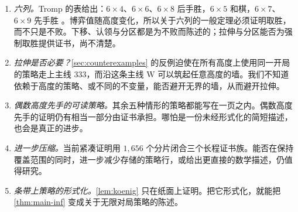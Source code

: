 \documentclass[11pt,a4paper]{article}
\theoremstyle{zhthm}
\newcommand{\W}{\mathrm{W}}
\begin{document}
\begin{enumerate}
  \item \emph{六列。}Tromp 的表给出：$6\times4$、$6\times6$、$6\times8$ 后手胜，$6\times5$ 和棋，$6\times7$、$6\times9$ 先手胜 \cite{tromp2026}。博弈值随高度变化，所以关于六列的一般定理必须证明取胜，而不只是不败。下移、认领与分区都是为不败而陈述的；拉伸与分区能否为强制取胜提供证书，尚不清楚。
  \item \emph{拉伸是否必要？}\cref{sec:counterexamples} 的反例迫使在所有高度上使用同一开局的策略走上主线 $333$，而沿这条主线 $\W$ 可以筑起任意高度的墙。我们不知道依赖于高度的策略、或不同的不变量，能否避开无界的墙，从而避开拉伸。
  \item \emph{偶数高度先手的可读策略。}其余五种情形的策略都能写在一页之内。偶数高度先手的证明仍有相当一部分由证书承担。哪怕是一份未经形式化的简短描述，也会是真正的进步。
  \item \emph{进一步压缩。}当前紧凑证明用 $1{,}656$ 个分片闭合三个长程证书族。能否在保持覆盖范围的同时，进一步减少存储的策略行，或给出更直接的数学描述，仍值得研究。
  \item \emph{条带上策略的形式化。}\cref{lem:koenig} 只在纸面上证明。把它形式化，就能把 \cref{thm:main-inf} 变成关于无限对局策略的陈述。
\end{enumerate}
\end{document}
